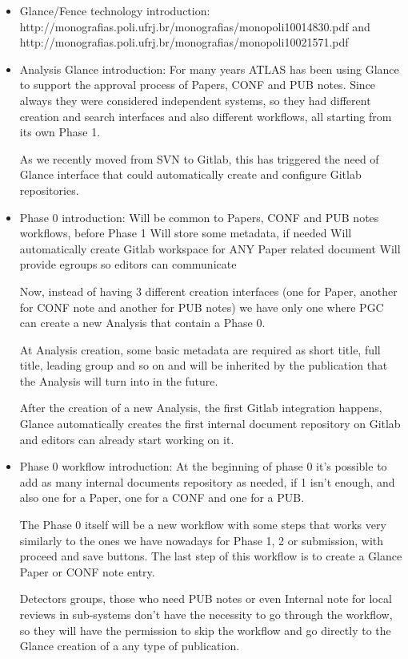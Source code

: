\begin{itemize}
\item Glance/Fence technology introduction:
http://monografias.poli.ufrj.br/monografias/monopoli10014830.pdf and http://monografias.poli.ufrj.br/monografias/monopoli10021571.pdf

\item Analysis Glance introduction:
For many years ATLAS has been using Glance to support the approval process of Papers, CONF and PUB notes. Since always they were considered independent systems, so they had different creation and search interfaces and also different workflows, all starting from its own Phase 1.

As we recently moved from SVN to Gitlab, this has triggered the need of Glance interface that could automatically create and configure Gitlab repositories.

\item Phase 0 introduction:
Will be common to Papers, CONF and PUB notes workflows, before Phase 1
Will store some metadata, if needed
Will automatically create Gitlab workspace for ANY Paper related document
Will provide egroups so editors can communicate

Now, instead of having 3 different creation interfaces (one for Paper, another for CONF note and another for PUB notes) we have only one where PGC can create a new Analysis that contain a Phase 0.

At Analysis creation, some basic metadata are required as short title, full title, leading group and so on and will be inherited by the publication that the Analysis will turn into in the future.

After the creation of a new Analysis, the first Gitlab integration happens, Glance automatically creates the first internal document repository on Gitlab and editors can already start working on it.

\item Phase 0 workflow introduction:
At the beginning of phase 0 it's possible to add as many internal documents repository as needed, if 1 isn't enough, and also one for a Paper, one for a CONF and one for a PUB.

The Phase 0 itself will be a new workflow with some steps that works very similarly to the ones we have nowadays for Phase 1, 2 or submission, with proceed and save buttons. The last step of this workflow is to create a Glance Paper or CONF note entry.

Detectors groups, those who need PUB notes or even Internal note for local reviews in sub-systems don’t have the necessity to go through the workflow, so they will have the permission to skip the workflow and go directly to the Glance creation of a any type of publication.


\end{itemize}
